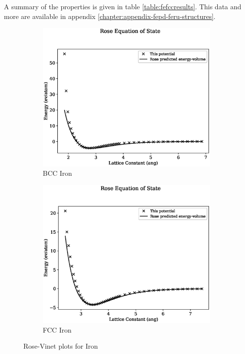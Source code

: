 A summary of the properties is given in table \ref{table:fefccresults}.  This data and more are available in appendix \ref{chapter:appendix-fepd-feru-structures}.





\begin{figure}[htb]
\begin{subfigure}{.48\textwidth}
  \centering
  \includegraphics[width=.94\linewidth]{chapters/potentials_fe_pd_ru/fepd_potential/eos/rose_plot_bp_0.eps}  
  \caption{BCC Iron}
  \label{fig:rose-vinet-bcc-fe}
\end{subfigure}
\begin{subfigure}{.48\textwidth}
  \centering
  \includegraphics[width=.94\linewidth]{chapters/potentials_fe_pd_ru/fepd_potential/eos/rose_plot_bp_1.eps}  
  \caption{FCC Iron}
  \label{fig:rose-vinet-fcc-fe}
\end{subfigure}
\caption{Rose-Vinet plots for Iron}
\label{fig:fe-rosevinet}
\end{figure}

